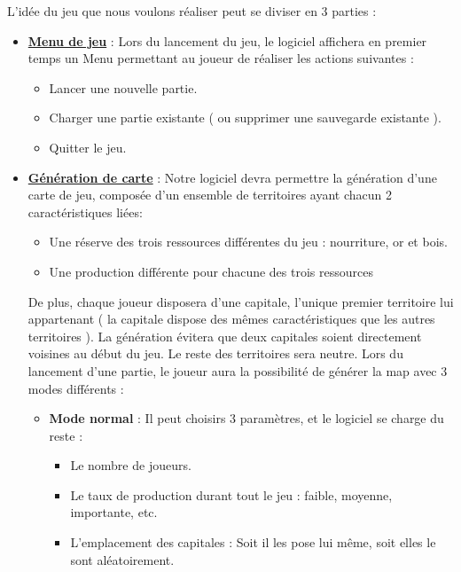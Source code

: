   L'idée du jeu que nous voulons réaliser peut se diviser en 3 parties : 
  \begin{itemize}
    \vspace{1cm}
    \item \textbf{\underline{Menu de jeu}} : Lors du lancement du jeu, le logiciel affichera en premier temps un Menu permettant au joueur de réaliser les actions suivantes : 
    
      \begin{itemize}
  
	\item Lancer une nouvelle partie.
	\item Charger une partie existante ( ou supprimer une sauvegarde existante ).
	\item Quitter le jeu.
  
      \end{itemize}
    \vspace{1cm}
    \item \textbf{\underline{Génération de carte}} : Notre logiciel devra permettre la génération d'une carte de jeu, composée d'un ensemble de territoires ayant chacun 2 caractéristiques  liées: 
      \begin{itemize}
	\item Une réserve des trois ressources différentes du jeu : nourriture, or et bois.
	\item Une production différente pour chacune des trois ressources
      \end{itemize}
      De plus, chaque joueur disposera {d'une capitale}, l'unique premier territoire  lui appartenant ( la capitale dispose des mêmes caractéristiques que les autres territoires ). 
      La génération évitera que deux capitales soient directement voisines au début du jeu. Le reste des territoires sera neutre.
      Lors du lancement d'une partie, le joueur aura la possibilité de générer la map avec 3 modes différents : 
      \begin{itemize}
	\item \textbf{Mode normal} : Il peut choisirs 3 paramètres, et le logiciel se charge du reste :
	
	\begin{itemize}
	  \item Le nombre de joueurs.
	  \item Le taux de production durant tout le jeu  : faible, moyenne, importante, etc.
	  \item L'emplacement des capitales : Soit il les pose lui même, soit elles le sont aléatoirement.
	\end{itemize}
  

\end{itemize}
\end{itemize}
